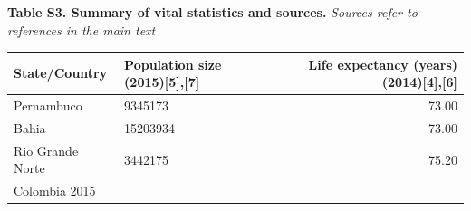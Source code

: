 \documentclass[10pt,letterpaper]{article}
\begin{document}
\textbf{Table S3. Summary of vital statistics and sources.}
\emph{Sources refer to references in the main text} \small

\begin{longtable}[]{@{}llr@{}}
\toprule
\begin{minipage}[b]{0.17\columnwidth}\raggedright\strut
State/Country\strut
\end{minipage} & \begin{minipage}[b]{0.29\columnwidth}\raggedright\strut
Population size (2015){[}5{]},{[}7{]}\strut
\end{minipage} & \begin{minipage}[b]{0.45\columnwidth}\raggedleft\strut
Life expectancy (years) (2014){[}4{]},{[}6{]}\strut
\end{minipage}\tabularnewline
\midrule
\endhead
\begin{minipage}[t]{0.17\columnwidth}\raggedright\strut
Pernambuco\strut
\end{minipage} & \begin{minipage}[t]{0.29\columnwidth}\raggedright\strut
9345173\strut
\end{minipage} & \begin{minipage}[t]{0.45\columnwidth}\raggedleft\strut
73.00\strut
\end{minipage}\tabularnewline
\begin{minipage}[t]{0.17\columnwidth}\raggedright\strut
Bahia\strut
\end{minipage} & \begin{minipage}[t]{0.29\columnwidth}\raggedright\strut
15203934\strut
\end{minipage} & \begin{minipage}[t]{0.45\columnwidth}\raggedleft\strut
73.00\strut
\end{minipage}\tabularnewline
\begin{minipage}[t]{0.17\columnwidth}\raggedright\strut
Rio Grande Norte\strut
\end{minipage} & \begin{minipage}[t]{0.29\columnwidth}\raggedright\strut
3442175\strut
\end{minipage} & \begin{minipage}[t]{0.45\columnwidth}\raggedleft\strut
75.20\strut
\end{minipage}\tabularnewline
\begin{minipage}[t]{0.17\columnwidth}\raggedright\strut
Colombia 2015\strut
\end{minipage} & \begin{minipage}[t]{0.29\columnwidth}\raggedright\strut

\end{minipage}
\end{longtable}
\end{document}
